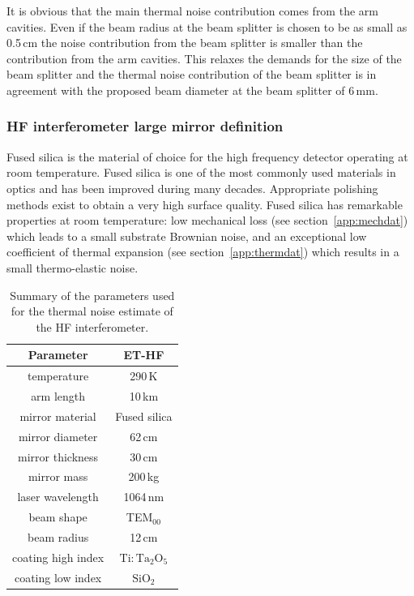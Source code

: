 It is obvious that the main thermal noise contribution comes from the arm cavities. Even if the beam radius at the beam splitter is chosen to be as small as 0.5\,cm the noise contribution from the beam splitter is smaller than the contribution from the arm cavities. This relaxes the demands for the size of the beam splitter and the thermal noise contribution of the beam splitter is in agreement with the proposed beam diameter at the beam splitter of 6\,mm.

\FloatBarrier
\subsubsection{HF interferometer large mirror definition}

Fused silica is the material of choice for the high frequency detector operating at room temperature. Fused silica is one of the most commonly used materials in optics and has been improved during many decades. Appropriate polishing methods exist to obtain a very high surface quality. Fused silica has remarkable properties at room temperature: low mechanical loss (see section~\ref{app:mechdat}) which leads to a small substrate Brownian noise, and an exceptional low coefficient of thermal expansion (see section~\ref{app:thermdat}) which results in a small thermo-elastic noise.

\begin{table}[!h]
\begin{center}
\begin{tabular}{|c|c|} \hline
Parameter & ET-HF \\ \hline
temperature & 290\,K \\
arm length & 10\,km \\ 
mirror material & Fused silica \\
mirror diameter & 62\,cm \\
mirror thickness & 30\,cm \\
mirror mass & 200\,kg \\
laser wavelength & 1064\,nm \\
beam shape & TEM$_{00}$ \\
beam radius & 12\,cm \\
coating high index & $\mathrm{Ti:Ta_2O_5}$ \\
coating low index & $\mathrm{SiO_2}$ \\ 
\hline
\end{tabular}
\end{center}
\caption{Summary of the parameters used for the thermal noise estimate of the HF interferometer.}
\label{tab:HF_dat}
\end{table}

